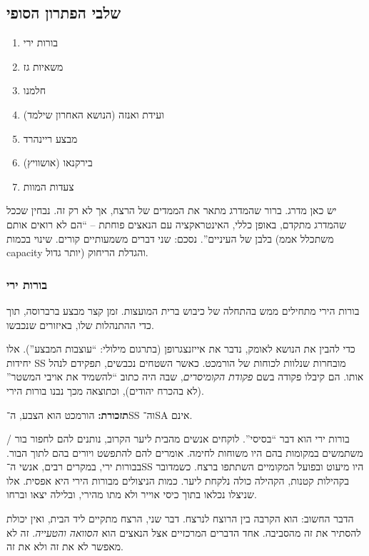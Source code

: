 \documentclass[]{article}
\theoremstyle{definition}
\begin{document}
	\subsection{שלבי הפתרון הסופי}
	\begin{multicols}{2}
		\begin{enumerate}
			\item בורות ירי
			\item משאיות גז
			\item חלמנו
			\item ועידת ואנזה (הנושא האחרון שילמד)
			\item מבצע ריינהרד
			\item בירקנאו (אושוויץ)
			\item צעדות המוות
		\end{enumerate}
	\end{multicols}
	יש כאן מדרג. ברור שהמדרג מתאר את הממדים של הרצח, אך לא רק זה. נבחין שככל שהמדרג מתקדם, באופן כללי, האינטראקציה עם הנאצים פוחתת – ``הם לא רואים אותם בלבן של העיניים''. נסכם: שני דברים משמעותיים קורים. שינוי בכמות (משתכלל אממ capacity יותר גדול) והגדלת הריחוק. 
	
	
	\subsubsection{בורות ירי}
	בורות הירי מתחילים ממש בהתחלה של כיבוש ברית המועצות. זמן קצר מבצע ברברוסה, תוך כדי ההתנהלות שלו, באיזורים שנכבשו. 
	
	כדי להבין את הנושא לאומק, נדבר את אייזנצגרופן (בתרגום מילולי: ``עוצבות המבצע''). אלו יחידות SS מובחרות שנלוות לכוחות של הורמכט. כאשר השטחים נכבשים, תפקידם לנהל אותו. הם קיבלו פקודה בשם \textit{פקודת הקומיסרים}, שבה היה כתוב ``להשמיד את אויבי המשטר'' (לא בהכרח יהודים), וכתוצאה מכך נבנו בורות הירי. 
	
	\textbf{תזכורת: }הורמכט הוא הצבע, ה־SS וה־SA אינם. 
	
	בורות ירי הוא דבר ``בסיסי''. לוקחים אנשים מהבית ליער הקרוב, נותנים להם לחפור בור / משתמשים במקומות בהם היו משוחות לחימה. אומרים להם להתפשט ויורים בהם לתוך הבור. בבורות ירי, במקרים רבים, אנשי ה־SS היו מיעוט ובפועל המקומיים השתתפו ברצח. כשמדובר בקהילות קטנות, הקהילה כולה נלקחת ליער. כמות הניצולים מבורות הירי היא אפסית. אלו שניצלו נכלאו בתוך כיסי אוייר ולא מתו מהירי, ובלילה יצאו וברחו. 
	
	הדבר החשוב: הוא הקרבה בין הרוצח לנרצח. דבר שני, הרצח מתקיים ליד הבית, ואין יכולת להסתיר את זה מהסביבה. אחד הדברים המרכזיים אצל הנאצים הוא \textit{הסוואה והטעייה}. זה לא מאפשר לא את זה ולא את זה. 
	
\end{document}
